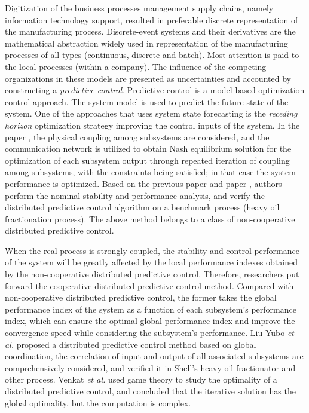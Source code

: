 \documentclass[conference]{IEEEtran}
\begin{document}
Digitization of the business processes management supply chains, namely information technology support, resulted in preferable discrete representation of the manufacturing process. Discrete-event systems and their derivatives are the mathematical abstraction widely used in representation of the manufacturing processes of all types (continuous, discrete and batch). Most attention is paid to the local processes (within a company). The influence of the competing organizations in these models are presented as uncertainties and accounted by constructing a \emph{predictive control}.  Predictive control is a model-based optimization control approach. The system model is used to predict the future state of the system. One of the approaches that uses system state forecasting is the \emph{receding horizon} optimization strategy improving the control inputs of the system. In the paper \cite{dux}, the physical coupling among subsystems are considered, and the communication network is utilized to obtain Nash equilibrium solution for the optimization of each subsystem output through repeated iteration of coupling among subsystems, with the constraints being satisfied; in that case the system performance is optimized. Based on the previous paper \cite{dux} and paper \cite{lis}, authors perform the nominal stability and performance analysis, and verify the distributed predictive control algorithm on a benchmark process (heavy oil fractionation process). The above method belongs to a class of non-cooperative distributed predictive control.

When the real process is strongly coupled, the stability and control performance of the system will be greatly affected by the local performance indexes obtained by the non-cooperative distributed predictive control. Therefore, researchers put forward the cooperative distributed predictive control method. Compared with non-cooperative distributed predictive control, the former takes the global performance index of the system as a function of each subsystem's performance index, which can ensure the optimal global performance index and improve the convergence speed while considering the subsystem's performance. Liu Yubo \emph{et al.} \cite{liuy} proposed a distributed predictive control method based on global coordination, the correlation of input and output of all associated subsystems are comprehensively considered, and verified it in Shell's heavy oil fractionator and other process. Venkat \emph{et al.} \cite{venkat} used game theory to study the optimality of a distributed predictive control, and concluded that the iterative solution has the global optimality, but the computation is complex.
\end{document}
